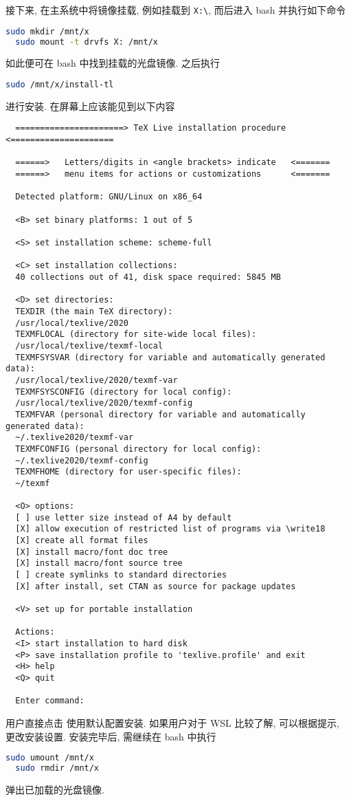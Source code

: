 接下来, 在主系统中将镜像挂载,
例如挂载到 \texttt{X:\textbackslash},
而后进入 \textsf{bash} 并执行如下命令
\begin{lstlisting}[language = bash]
  sudo mkdir /mnt/x
  sudo mount -t drvfs X: /mnt/x
\end{lstlisting}
如此便可在 \textsf{bash} 中找到挂载的光盘镜像.
之后执行
\begin{lstlisting}[language = bash]
  sudo /mnt/x/install-tl
\end{lstlisting}
进行安装.
在屏幕上应该能见到以下内容
\begin{lstlisting}
  ======================> TeX Live installation procedure <=====================

  ======>   Letters/digits in <angle brackets> indicate   <=======
  ======>   menu items for actions or customizations      <=======
  
  Detected platform: GNU/Linux on x86_64
  
  <B> set binary platforms: 1 out of 5
  
  <S> set installation scheme: scheme-full
  
  <C> set installation collections:
  40 collections out of 41, disk space required: 5845 MB
  
  <D> set directories:
  TEXDIR (the main TeX directory):
  /usr/local/texlive/2020
  TEXMFLOCAL (directory for site-wide local files):
  /usr/local/texlive/texmf-local
  TEXMFSYSVAR (directory for variable and automatically generated data):
  /usr/local/texlive/2020/texmf-var
  TEXMFSYSCONFIG (directory for local config):
  /usr/local/texlive/2020/texmf-config
  TEXMFVAR (personal directory for variable and automatically generated data):
  ~/.texlive2020/texmf-var
  TEXMFCONFIG (personal directory for local config):
  ~/.texlive2020/texmf-config
  TEXMFHOME (directory for user-specific files):
  ~/texmf

  <O> options:
  [ ] use letter size instead of A4 by default
  [X] allow execution of restricted list of programs via \write18
  [X] create all format files
  [X] install macro/font doc tree
  [X] install macro/font source tree
  [ ] create symlinks to standard directories
  [X] after install, set CTAN as source for package updates
  
  <V> set up for portable installation
  
  Actions:
  <I> start installation to hard disk
  <P> save installation profile to 'texlive.profile' and exit
  <H> help
  <Q> quit
  
  Enter command: 
\end{lstlisting}
用户直接点击  使用默认配置安装.
如果用户对于 WSL 比较了解, 可以根据提示, 更改安装设置.
安装完毕后, 需继续在 \textsf{bash} 中执行
\begin{lstlisting}[language = bash]
  sudo umount /mnt/x
  sudo rmdir /mnt/x
\end{lstlisting}
弹出已加载的光盘镜像.

